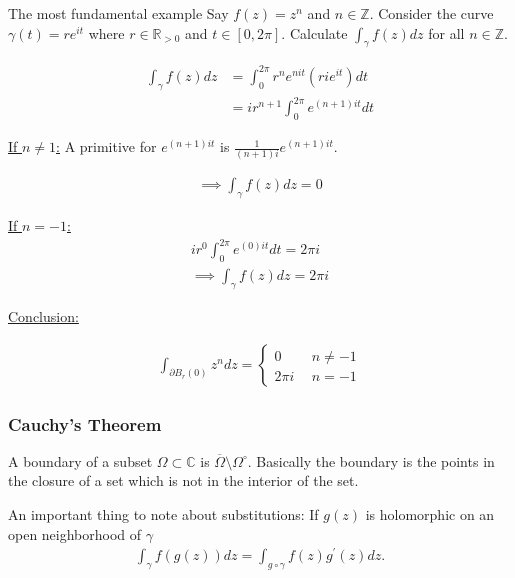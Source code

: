 \documentclass{article}
\begin{document}
\begin{exmp}{The most fundamental example}{}
Say \( f(z) = z^n \) and \( n \in \mathbb{Z}  \). Consider the curve \( \gamma (t)= re^{it}  \) where \( r \in \mathbb{R} _{>0} \) and \( t \in [0, 2\pi ] \).
Calculate \( \int _\gamma f(z) dz \) for all \( n \in \mathbb{Z}  \).
\tcbline

\begin{align*}
    \int _\gamma f(z) dz &= \int_{0}^{2\pi} r^n e^{nit} (rie^{it}) dt \\ 
    &= ir^{n+ 1} \int _0^{2\pi } e^{(n + 1)it} dt
\end{align*}

\underline{If \( n\neq 1 \):} A primitive for \( e^{(n + 1)it} \)  is \( \frac{1}{(n + 1)i} e^{(n + 1)it}\).

\begin{align*}
    \implies \boxed{\int_\gamma f(z) dz = 0 \tag{$n \neq - 1$}} 
\end{align*}

\underline{If \( n = -1 \):}
\begin{align*}
    ir^{0} \int _0^{2\pi } e^{(0)it} dt = 2\pi i\\
    \implies \boxed{\int_\gamma f(z) dz = 2\pi i \tag{$n = - 1$}}
\end{align*}

\underline{Conclusion:}

\begin{align*}
    \int _{\partial B_r(0)}z^n dz = \begin{cases}
        0 \ \ &n\neq - 1 \\
        2\pi i \ \ &n = - 1
    \end{cases}
\end{align*}


\end{exmp}

\subsubsection{Cauchy's Theorem}

A boundary of a subset \( \Omega \subset \mathbb{C}  \) is \( \overline{\Omega }\setminus  \Omega ^\circ  \). Basically the boundary is the points in the closure of a set which is not in the interior of the set. 

An important thing to note about substitutions:
If \( g(z) \) is holomorphic on an open neighborhood of \( \gamma  \) 
\begin{align*}
    \int _\gamma f(g(z)) dz = \int _{g \circ \gamma } f(z) g^\prime (z) dz.
\end{align*}
\end{document}
